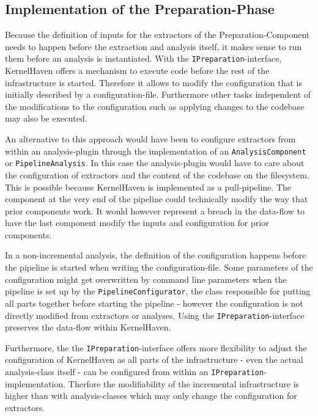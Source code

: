 \documentclass[a4paper]{article}
\begin{document}
\subsection{Implementation of the Preparation-Phase}\label{preparation-phase}

Because the definition of inputs for the extractors of the Preparation-Component needs to happen before the extraction and analysis itself, it makes sense to run them before an analysis is instantiated. With the \texttt{IPreparation}-interface, KernelHaven offers a mechanism to execute code before the rest of the infrastructure is started. Therefore it allows to modify the configuration that is initially described by a configuration-file. Furthermore other tasks independent of the modifications to the configuration such as applying changes to the codebase may also be executed.

An alternative to this approach would have been to configure extractors from within an analysis-plugin through the implementation of an \texttt{AnalysisComponent} or \texttt{PipelineAnalysis}. In this case the analysis-plugin would have to care about the configuration of extractors and the content of the codebase on the filesystem. This is possible because KernelHaven is implemented as a pull-pipeline. The component at the very end of the pipeline could technically modify the way that prior components work. It would however represent a breach in the data-flow to have the last component modify the inputs and configuration for prior  components. 

In a non-incremental analysis, the definition of the configuration happens before the pipeline is started when writing the configuration-file. Some parameters of the configuration might get overwritten by command line parameters when the pipeline is set up by the \texttt{PipelineConfigurator}, the class responsible for putting all parts together before starting the pipeline - however the configuration is not directly modified from extractors or analyses. Using the \texttt{IPreparation}-interface preserves the data-flow within KernelHaven.

Furthermore, the the \texttt{IPreparation}-interface offers more flexibility to adjust the configuration of KernelHaven as all parts of the infrastructure - even the actual analysis-class itself - can be configured from within an \texttt{IPreparation}-implementation. Therfore the modifiability of the incremental infrastructure is higher than with analysis-classes which may only change the configuration for extractors.
\end{document}
